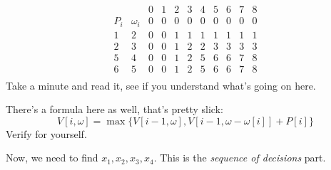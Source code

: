 \documentclass[10pt, oneside]{article}
\begin{document}
\[
\begin{array}{c|c|ccccccccc}
  & & 0 & 1 & 2 & 3 & 4 & 5 & 6 & 7 & 8 \\ \hline
P_i & \omega_i & 0 & 0 & 0 & 0 & 0 & 0 & 0 & 0 & 0 \\
1 & 2 & 0 & 0 & 1 & 1 & 1 & 1 & 1 & 1 & 1 \\
2 & 3 & 0 & 0 & 1 & 2 & 2 & 3 & 3 & 3 & 3 \\
5 & 4 & 0 & 0 & 1 & 2 & 5 & 6 & 6 & 7 & 8 \\
6 & 5 & 0 & 0 & 1 & 2 & 5 & 6 & 6 & 7 & 8 \\
\end{array}
\]
Take a minute and read it, see if you understand what's going on here. 

There's a formula here as well, that's pretty slick:
\[ V[i , \omega] = \max \{V[i-1, \omega], V[i-1, \omega - \omega[i]] + P[i] \} \]
Verify for yourself. 

Now, we need to find $x_1, x_2, x_3, x_4$. This is the \textit{sequence of decisions} part. 
\end{document}
